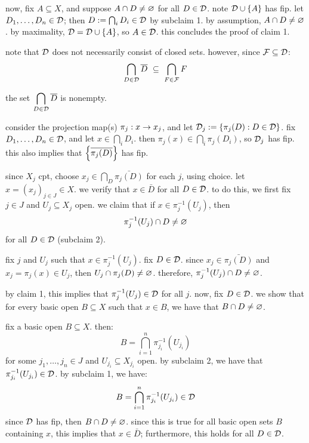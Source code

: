 now, fix $A\subseteq X$, and suppose $A\cap D\neq\varnothing$ for all $D\in\mathcal{D}$.
note $\mathcal{D}\cup\left\{{A}\right\}$ has fip.
let $D_{1},\dots,D_{n}\in\mathcal{D}$; then $D:=\bigcap_{i}D_{i}\in\mathcal{D}$ by
subclaim 1. by assumption, $A\cap D\neq\varnothing$.
by maximality, $\mathcal{D}=\mathcal{D}\cup\left\{{A}\right\}$, so $A\in\mathcal{D}$.
this concludes the proof of claim 1.

note that $\mathcal{D}$ does not necessarily consist of closed sets.
however, since $\mathcal{F}\subseteq\mathcal{D}$:
\begin{equation*}
    \bigcap_{D\in\cl{D}}\bar{D} \ \subseteq \ \bigcap_{F\in\cl{F}}F
\end{equation*}

\begin{crll}[type=Claim,num=2]
    the set $\displaystyle\bigcap_{D\in\mathcal{D}}\overline{D}$ is nonempty.
\end{crll}

consider the projection map(s) $\pi_{j}:x\rightarrow x_{j}$, and
let $\mathcal{D}_{j}:=\left\{{\pi_{j}(D):D\in\mathcal{D}}\right\}$.
fix $D_{1},\dots,D_{n}\in\mathcal{D}$, and let $x\in\bigcap_{i}D_{i}$.
then $\pi_{j}(x)\in\bigcap_{i}\pi_{j}(D_{i})$, so $\mathcal{D}_{j}$ has fip.
this also implies that $\left\{{\overline{\pi_{j}(D)}}\right\}$ has fip.

since $X_{j}$ cpt, choose $x_{j}\in\bigcap_{D}\bar{\pi_{j}(D)}$ for each $j$,
using choice. let $x=(x_{j})_{j\in J}\in X$.
we verify that $x\in\bar{D}$ for all $D\in\mathcal{D}$.
to do this, we first fix $j\in J$ and $U_{j}\subseteq X_{j}$ open.
we claim that if $x\in\pi_{j}^{-1}(U_{j})$, then
\begin{equation*}
    \pi_{j}^{-1}(U_{j})\cap D\neq\varnothing
\end{equation*}
for all $D\in\mathcal{D}$ (subclaim 2).

\begin{block}
    fix $j$ and $U_{j}$ such that $x\in\pi_{j}^{-1}(U_{j})$. fix $D\in\mathcal{D}$.
    since $x_{j}\in\bar{\pi_{j}(D)}$ and $x_{j}=\pi_{j}(x)\in U_{j}$,
    then $U_{j}\cap\pi_{j}(D)\neq\varnothing$.
    therefore, $\pi_{j}^{-1}(U_{j})\cap D\neq\varnothing$.
\end{block}

by claim 1, this implies that $\pi_{j}^{-1}(U_{j})\in\mathcal{D}$ for all $j$.
now, fix $D\in\mathcal{D}$. we show that for every basic open $B\subseteq X$ such that
$x\in B$, we have that $B\cap D\neq\varnothing$.

fix a basic open $B\subseteq X$. then:
\begin{equation*}
    B=\bigcap_{i=1}^{n}\pi_{j_{i}}^{-1}(U_{j_{i}})
\end{equation*}
for some $j_{1},\dots,j_{n}\in J$ and $U_{j_{i}}\subseteq X_{j_{i}}$ open.
by subclaim 2, we have that $\pi_{j_{i}}^{-1}(U_{j_{i}})\in\mathcal{D}$.
by subclaim 1, we have:
\begin{equation*}
    B=\bigcap_{i=1}^{n}\pi_{j_{i}}^{-1}(U_{j_{i}})\in\mathcal{D}
\end{equation*}
since $\mathcal{D}$ has fip, then $B\cap D\neq\varnothing$.
since this is true for all basic open sets $B$ containing $x$, this implies that
$x\in\bar{D}$; furthermore, this holds for all $D\in\mathcal{D}$.

